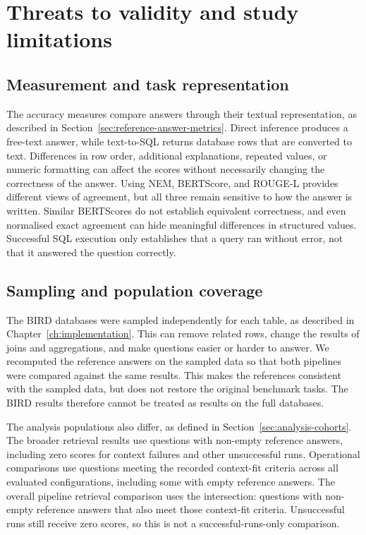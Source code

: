 \section{Threats to validity and study limitations} \label{sec:validity-limitations}

\subsection{Measurement and task representation}

The accuracy measures compare answers through their textual representation, as described in
Section~\ref{sec:reference-answer-metrics}. Direct inference produces a free-text answer, while text-to-SQL
returns database rows that are converted to text. Differences in row order, additional explanations, repeated
values, or numeric formatting can affect the scores without necessarily changing the correctness of the
answer. Using NEM, BERTScore, and ROUGE-L provides different views of agreement, but all three remain
sensitive to how the answer is written. Similar BERTScores do not establish equivalent correctness, and even
normalised exact agreement can hide meaningful differences in structured values. Successful SQL execution
only establishes that a query ran without error, not that it answered the question correctly.

\subsection{Sampling and population coverage}

The BIRD databases were sampled independently for each table, as described in
Chapter~\ref{ch:implementation}. This can remove related rows, change the results of joins and aggregations,
and make questions easier or harder to answer. We recomputed the reference answers on the sampled data so
that both pipelines were compared against the same results. This makes the references consistent with the
sampled data, but does not restore the original benchmark tasks. The BIRD results therefore cannot be treated
as results on the full databases.

The analysis populations also differ, as defined in Section~\ref{sec:analysis-cohorts}. The broader retrieval
results use questions with non-empty reference answers, including zero scores for context failures and other
unsuccessful runs. Operational comparisons use questions meeting the recorded context-fit criteria across all
evaluated configurations, including some with empty reference answers. The overall pipeline retrieval
comparison uses the intersection: questions with non-empty reference answers that also meet those context-fit
criteria. Unsuccessful runs still receive zero scores, so this is not a successful-runs-only comparison.

